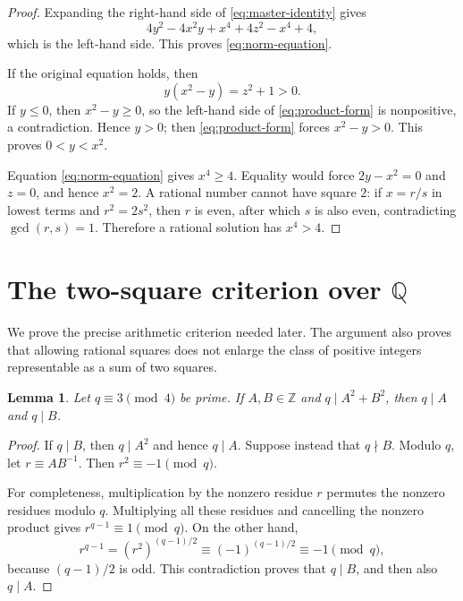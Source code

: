 \documentclass[11pt]{article}
\numberwithin{equation}{section}
\newtheorem{lemma}[theorem]{Lemma}
\theoremstyle{definition}
\theoremstyle{remark}
\newcommand{\Q}{\mathbb{Q}}
\newcommand{\Z}{\mathbb{Z}}
\begin{document}
\begin{proof}
Expanding the right-hand side of \eqref{eq:master-identity} gives
\[
4y^{2}-4x^{2}y+x^{4}+4z^{2}-x^{4}+4,
\]
which is the left-hand side.  This proves \eqref{eq:norm-equation}.

If the original equation holds, then
\begin{equation}\label{eq:product-form}
 y(x^{2}-y)=z^{2}+1>0.
\end{equation}
If $y\le0$, then $x^{2}-y\ge0$, so the left-hand side of
\eqref{eq:product-form} is nonpositive, a contradiction.  Hence $y>0$;
then \eqref{eq:product-form} forces $x^{2}-y>0$.  This proves
$0<y<x^{2}$.

Equation \eqref{eq:norm-equation} gives $x^{4}\ge4$.  Equality would
force $2y-x^{2}=0$ and $z=0$, and hence $x^{2}=2$.  A rational number
cannot have square $2$: if $x=r/s$ in lowest terms and $r^{2}=2s^{2}$,
then $r$ is even, after which $s$ is also even, contradicting
$\gcd(r,s)=1$.  Therefore a rational solution has $x^{4}>4$.
\end{proof}

\section{The two-square criterion over \texorpdfstring{$\Q$}{Q}}

We prove the precise arithmetic criterion needed later.  The argument
also proves that allowing rational squares does not enlarge the class
of positive integers representable as a sum of two squares.

\begin{lemma}\label{lem:3mod4-divides-both}
Let $q\equiv3\pmod4$ be prime.  If $A,B\in\Z$ and
$q\mid A^{2}+B^{2}$, then $q\mid A$ and $q\mid B$.
\end{lemma}

\begin{proof}
If $q\mid B$, then $q\mid A^{2}$ and hence $q\mid A$.  Suppose instead
that $q\nmid B$.  Modulo $q$, let $r\equiv AB^{-1}$.  Then
$r^{2}\equiv-1\pmod q$.

For completeness, multiplication by the nonzero residue $r$ permutes
the nonzero residues modulo $q$.  Multiplying all these residues and
cancelling the nonzero product gives
$r^{q-1}\equiv1\pmod q$.  On the other hand,
\[
 r^{q-1}=(r^{2})^{(q-1)/2}
 \equiv(-1)^{(q-1)/2}\equiv-1\pmod q,
\]
because $(q-1)/2$ is odd.  This contradiction proves that $q\mid B$,
and then also $q\mid A$.
\end{proof}
\end{document}

